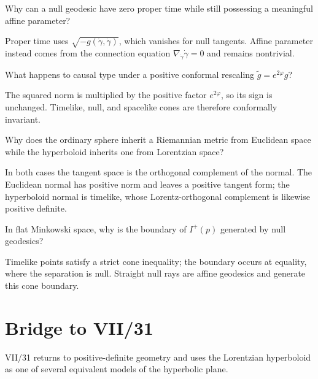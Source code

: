 \begin{problem}\label{prob:vii30-ch02}
Why can a null geodesic have zero proper time while still possessing a meaningful affine parameter?
\end{problem}
\begin{solution}
Proper time uses \(\sqrt{-g(\dot\gamma,\dot\gamma)}\), which vanishes for null tangents. Affine parameter instead comes from the connection equation \(\nabla_{\dot\gamma}\dot\gamma=0\) and remains nontrivial.
\end{solution}

\begin{problem}\label{prob:vii30-ch03}
What happens to causal type under a positive conformal rescaling \(\widetilde g=e^{2\varphi}g\)?
\end{problem}
\begin{solution}
The squared norm is multiplied by the positive factor \(e^{2\varphi}\), so its sign is unchanged. Timelike, null, and spacelike cones are therefore conformally invariant.
\end{solution}

\begin{problem}\label{prob:vii30-ch04}
Why does the ordinary sphere inherit a Riemannian metric from Euclidean space while the hyperboloid inherits one from Lorentzian space?
\end{problem}
\begin{solution}
In both cases the tangent space is the orthogonal complement of the normal. The Euclidean normal has positive norm and leaves a positive tangent form; the hyperboloid normal is timelike, whose Lorentz-orthogonal complement is likewise positive definite.
\end{solution}

\begin{problem}\label{prob:vii30-ch05}
In flat Minkowski space, why is the boundary of \(I^+(p)\) generated by null geodesics?
\end{problem}
\begin{solution}
Timelike points satisfy a strict cone inequality; the boundary occurs at equality, where the separation is null. Straight null rays are affine geodesics and generate this cone boundary.
\end{solution}

\section*{Bridge to VII/31}
VII/31 returns to positive-definite geometry and uses the Lorentzian hyperboloid as one of several equivalent models of the hyperbolic plane.
